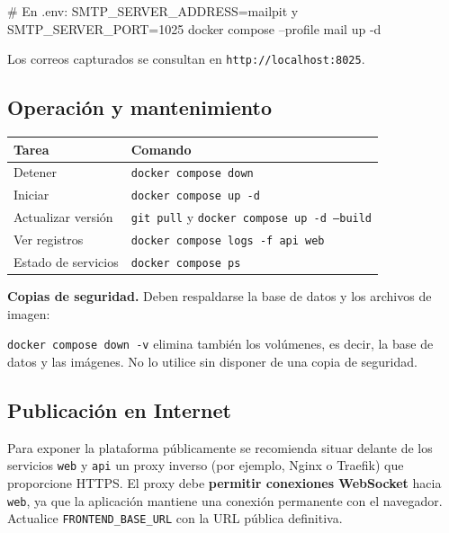 \documentclass[11pt,a4paper]{article}
\begin{document}
\begin{consola}
# En .env: SMTP_SERVER_ADDRESS=mailpit  y  SMTP_SERVER_PORT=1025
docker compose --profile mail up -d
\end{consola}

Los correos capturados se consultan en \texttt{http://localhost:8025}.

\subsection{Operación y mantenimiento}

\begin{center}
\begin{tabularx}{\textwidth}{@{}l Y@{}}
\toprule
{}
\textbf{Tarea} & \textbf{Comando} \\
\midrule
Detener & \texttt{docker compose down} \\
Iniciar & \texttt{docker compose up -d} \\
Actualizar versión & \texttt{git pull} y \texttt{docker compose up -d --build} \\
Ver registros & \texttt{docker compose logs -f api web} \\
Estado de servicios & \texttt{docker compose ps} \\
\bottomrule
\end{tabularx}
\end{center}

\textbf{Copias de seguridad.} Deben respaldarse la base de datos y los archivos de
imagen:


\begin{warnbox}
\texttt{docker compose down -v} elimina también los volúmenes, es decir, la base
de datos y las imágenes. No lo utilice sin disponer de una copia de seguridad.
\end{warnbox}

\subsection{Publicación en Internet}

Para exponer la plataforma públicamente se recomienda situar delante de los
servicios \texttt{web} y \texttt{api} un proxy inverso (por ejemplo, Nginx o
Traefik) que proporcione HTTPS. El proxy debe \textbf{permitir conexiones
WebSocket} hacia \texttt{web}, ya que la aplicación mantiene una conexión
permanente con el navegador. Actualice \texttt{FRONTEND\_BASE\_URL} con la URL
pública definitiva.
\end{document}
